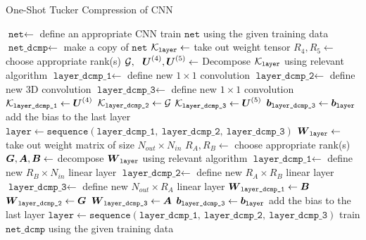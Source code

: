 \begin{algorithm} \caption{One-Shot Tucker Compression of CNN} \label{alg:one_shot_tucker}
\begin{algorithmic}[1]
    \State $\texttt{net} \leftarrow $ define an appropriate CNN
    \State train $\texttt{net}$ using the given training data
    \State $\texttt{net\_dcmp} \leftarrow $ make a copy of $\texttt{net}$
        \State $\mathcal{K}_{\texttt{layer}} \leftarrow $ take out weight tensor
        \State $R_4, R_5 \leftarrow$ choose appropriate rank(s)
        \State $\tensor{G}, \ \ \bs{U}^{(4)}, \bs{U}^{(5)} \leftarrow $ Decompose $\mathcal{K}_{\texttt{layer}}$ using relevant algorithm 
        \State $\texttt{layer\_dcmp\_1} \leftarrow $ define new $1\times 1$ convolution 
        \State $\texttt{layer\_dcmp\_2} \leftarrow $ define new 3D convolution
        \State $\texttt{layer\_dcmp\_3} \leftarrow $ define new $1\times 1$ convolution 
        \State $\mathcal{K}_{\texttt{layer\_dcmp\_1}} \leftarrow \boldsymbol{U}^{(4)}$ 
        \State $\mathcal{K}_{\texttt{layer\_dcmp\_2}} \leftarrow \mathcal{G}$
        \State $\mathcal{K}_{\texttt{layer\_dcmp\_3}} \leftarrow \boldsymbol{U}^{(5)}$ 
        \State $\boldsymbol{b}_{\texttt{layer\_dcmp\_3}} \leftarrow \boldsymbol{b}_{\texttt{layer}}$ add the bias to the last layer 
        \State $\texttt{layer} \leftarrow \texttt{sequence}(\texttt{layer\_dcmp\_1}, \  \texttt{layer\_dcmp\_2}, \ \texttt{layer\_dcmp\_3})$
    \EndFor
        \State $\boldsymbol{W}_{\texttt{layer}} \leftarrow $ take out weight matrix of size $N_{out} \times N_{in}$
        \State $R_A, R_B \leftarrow $ choose appropriate rank(s)
        \State $\boldsymbol{G}, \boldsymbol{A}, \boldsymbol{B} \leftarrow $ decompose $\boldsymbol{W}_{\texttt{layer}}$ using relevant algorithm 
        \State $\texttt{layer\_dcmp\_1} \leftarrow $ define new $R_B \times N_{in}$ linear layer 
        \State $\texttt{layer\_dcmp\_2} \leftarrow $ define new $R_A \times R_B$ linear layer 
        \State $\texttt{layer\_dcmp\_3} \leftarrow $ define new $N_{out} \times R_A$ linear layer 
        \State $\boldsymbol{W}_{\texttt{layer\_dcmp\_1}} \leftarrow \boldsymbol{B}$ 
        \State $\boldsymbol{W}_{\texttt{layer\_dcmp\_2}} \leftarrow \boldsymbol{G}$
        \State $\boldsymbol{W}_{\texttt{layer\_dcmp\_3}} \leftarrow \boldsymbol{A}$ 
        \State $\boldsymbol{b}_{\texttt{layer\_dcmp\_3}} \leftarrow \boldsymbol{b}_{\texttt{layer}}$ add the bias to the last layer 
        \State $\texttt{layer} \leftarrow \texttt{sequence}(\texttt{layer\_dcmp\_1}, \ \texttt{layer\_dcmp\_2}, \ \texttt{layer\_dcmp\_3})$
    \EndFor
    \State train $\texttt{net\_dcmp}$ using the given training data 
\end{algorithmic}
\end{algorithm}

